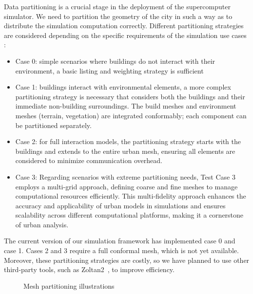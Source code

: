 \documentclass[runningheads]{llncs}
\begin{document}
Data partitioning is a crucial stage in the deployment of the supercomputer simulator. We need to partition the geometry of the city in such a way as to distribute the simulation computation correctly.
Different partitioning strategies are considered depending on the specific requirements of the simulation use cases :
\begin{itemize}
\item Case 0: simple scenarios where buildings do not interact with their environment, a basic listing and weighting strategy is sufficient
\item Case 1: buildings interact with environmental elements, a more complex partitioning strategy is necessary that considers both the buildings and their immediate non-building surroundings. The build meshes and environment meshes (terrain, vegetation) are integrated conformably; each component can be partitioned separately.
\item  Case 2: for full interaction models, the partitioning strategy starts with the buildings and extends to the entire urban mesh, ensuring all elements are considered to minimize communication overhead.
\item Case 3: Regarding scenarios with extreme partitioning needs, Test Case 3 employs a multi-grid approach, defining coarse and fine meshes to manage computational resources efficiently. This multi-fidelity approach enhances the accuracy and applicability of urban models in simulations and ensures scalability across different computational platforms, making it a cornerstone of urban analysis.
\end{itemize}

The current version of our simulation framework has implemented case 0 and case 1. Cases 2 and 3 require a full conformal mesh, which is not yet available. Moreover, these partitioning strategies are costly, so we have planned to use other third-party tools, such as Zoltan2~\cite{the_zoltan2_team_zoltan2_nodate}, to improve efficiency.
\begin{figure}
\centering
{}
\caption{Mesh partitioning illustrations}
\label{fig:partitioning}
\end{figure}
\end{document}
